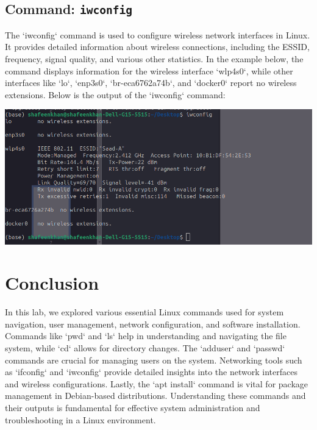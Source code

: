 \documentclass{article}
\begin{document}
\subsection{Command: \texttt{iwconfig}}
The `iwconfig` command is used to configure wireless network interfaces in Linux. It provides detailed information about wireless connections, including the ESSID, frequency, signal quality, and various other statistics. In the example below, the command displays information for the wireless interface `wlp4s0`, while other interfaces like `lo`, `enp3s0`, `br-eca6762a74b`, and `docker0` report no wireless extensions. Below is the output of the `iwconfig` command:
\begin{center}
    \includegraphics[width=0.8\linewidth]{9.png}
\end{center}


\section{Conclusion}
In this lab, we explored various essential Linux commands used for system navigation, user management, network configuration, and software installation. Commands like `pwd` and `ls` help in understanding and navigating the file system, while `cd` allows for directory changes. The `adduser` and `passwd` commands are crucial for managing users on the system. Networking tools such as `ifconfig` and `iwconfig` provide detailed insights into the network interfaces and wireless configurations. Lastly, the `apt install` command is vital for package management in Debian-based distributions. Understanding these commands and their outputs is fundamental for effective system administration and troubleshooting in a Linux environment.
\end{document}
